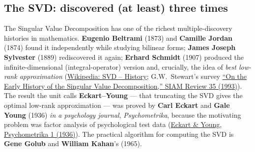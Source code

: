 \documentclass[11pt]{article}
\newcommand{\who}[1]{{\sffamily\bfseries #1}}
\newcommand{\yr}[1]{{\sffamily\color{BrickRed}(#1)}}
\begin{document}
\subsection{The SVD: discovered (at least) three times}
The Singular Value Decomposition has one of the richest multiple-discovery
histories in mathematics. \who{Eugenio Beltrami} \yr{1873} and \who{Camille Jordan}
\yr{1874} found it independently while studying bilinear forms; \who{James Joseph
Sylvester} \yr{1889} rediscovered it again; \who{Erhard Schmidt} \yr{1907} produced
the infinite-dimensional (integral-operator) version and, crucially, the idea of
\emph{best low-rank approximation}
(\href{https://en.wikipedia.org/wiki/Singular_value_decomposition\#History}{Wikipedia:
SVD -- History}; G.W.\ Stewart's survey
\href{https://www.jstor.org/stable/2132388}{``On the Early History of the Singular
Value Decomposition,'' SIAM Review 35 (1993)}). The result the unit calls
\who{Eckart--Young} --- that truncating the SVD gives the optimal low-rank
approximation --- was proved by \who{Carl Eckart} and \who{Gale Young} \yr{1936}
\emph{in a psychology journal}, \emph{Psychometrika}, because the motivating
problem was factor analysis of psychological test data
(\href{https://link.springer.com/article/10.1007/BF02288367}{Eckart \& Young,
Psychometrika 1 (1936)}). The practical algorithm for computing the SVD is
\who{Gene Golub} and \who{William Kahan}'s \yr{1965}.
\end{document}
